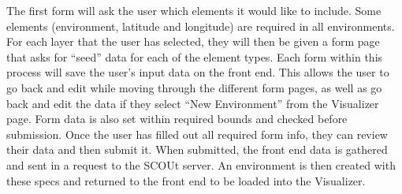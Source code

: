 The first form will ask the user which elements it would like to include.
Some elements (environment, latitude and longitude) are required in all environments.
For each layer that the user has selected, they will then be given a form page that asks for “seed” data for each of the element types.
Each form within this process will save the user’s input data on the front end.
This allows the user to go back and edit while moving through the different form pages, as well as go back and edit the data if they select “New Environment” from the Visualizer page.
Form data is also set within required bounds and checked before submission.
Once the user has filled out all required form info, they can review their data and then submit it.
When submitted, the front end data is gathered and sent in a request to the SCOUt server.
An environment is then created with these specs and returned to the front end to be loaded into the Visualizer.
